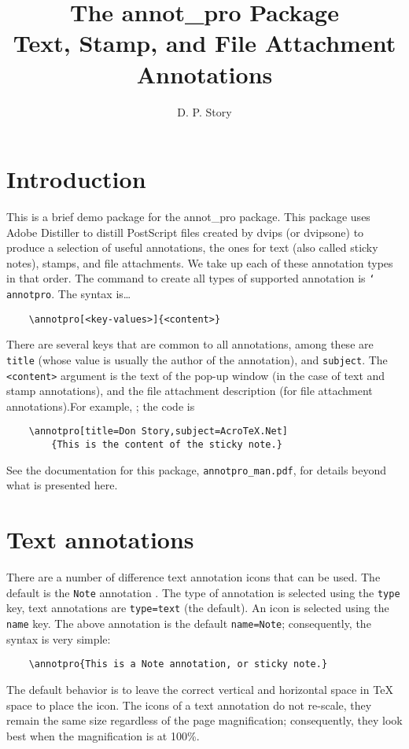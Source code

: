 \documentclass{article}
\title{The \textsf{annot\_pro} Package\texorpdfstring{\\[2ex]}{: }Text, Stamp, and File Attachment Annotations}
\author{D. P. Story}
\newcommand{\cs}[1]{\texttt{\char`\\#1}}
\begin{document}
\maketitle

\section{Introduction}

This is a  brief demo package for the \textsf{annot\_pro} package. This package uses
Adobe Distiller to distill PostScript files created by dvips (or dvipsone) to produce
a selection of useful annotations, the ones for text (also called sticky notes), stamps,
and file attachments. We take up each of these annotation types in that order. The command
to create all types of supported annotation is \cs{annotpro}. The syntax is\dots
\begin{verbatim}
    \annotpro[<key-values>]{<content>}
\end{verbatim}
There are several keys that are common to all annotations, among
these are \texttt{title} (whose value is usually the author of the
annotation), and \texttt{subject}. The \texttt{<content>} argument
is the text of the pop-up window (in the case of text and stamp
annotations), and the file attachment description (for file
attachment annotations).For example, ; the code is
\begin{verbatim}
    \annotpro[title=Don Story,subject=AcroTeX.Net]
        {This is the content of the sticky note.}
\end{verbatim}

See the documentation for this package, \texttt{annotpro\_man.pdf}, for details
beyond what is presented here.

\section{Text annotations}

There are a number of difference text annotation icons that can be used. The default
is the \texttt{Note} annotation . The
type of annotation is selected using the \texttt{type} key, text
annotations are \texttt{type=text} (the default). An icon is selected using the \texttt{name} key.
The above annotation is the default \texttt{name=Note}; consequently, the syntax is very simple:
\begin{verbatim}
    \annotpro{This is a Note annotation, or sticky note.}
\end{verbatim}
The default behavior is to leave the correct vertical and horizontal space in {\TeX} space to
place the icon. The icons of a text annotation do not re-scale, they remain the same size regardless
of the page magnification; consequently, they look best when the magnification is at 100\%.
\end{document}
